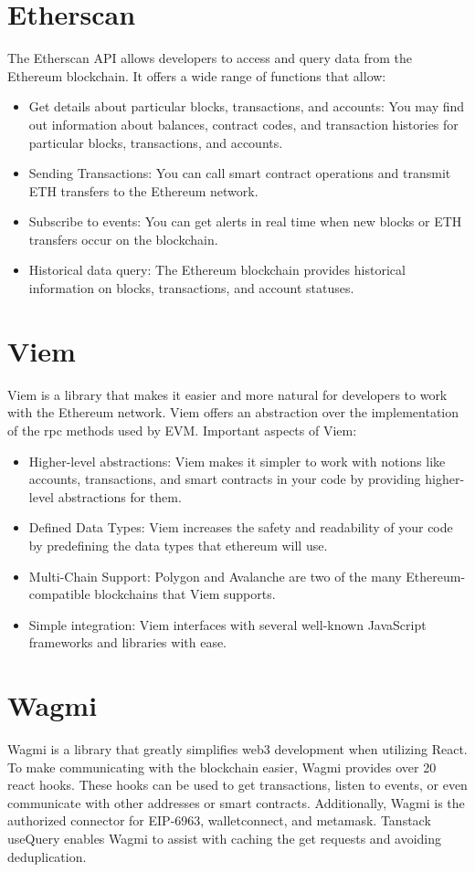 \section{Etherscan}
\label{sec:ch3sec8}
The Etherscan API allows developers to access and query data from the Ethereum blockchain. It offers a wide range of functions that allow:
\begin{itemize}
	\item Get details about particular blocks, transactions, and accounts: You may find out information about balances, contract codes, and transaction histories for particular blocks, transactions, and accounts.
	\item Sending Transactions: You can call smart contract operations and transmit ETH transfers to the Ethereum network.
	\item Subscribe to events: You can get alerts in real time when new blocks or ETH transfers occur on the blockchain.
	\item Historical data query: The Ethereum blockchain provides historical information on blocks, transactions, and account statuses.\cite{etherscan}
\end{itemize}

\section{Viem}
\label{sec:ch3sec9}
Viem is a library that makes it easier and more natural for developers to work with the Ethereum network. Viem offers an abstraction over the implementation of the rpc methods used by EVM.\cite{viem}
Important aspects of Viem:
\begin{itemize}
\item Higher-level abstractions: Viem makes it simpler to work with notions like accounts, transactions, and smart contracts in your code by providing higher-level abstractions for them.
\item Defined Data Types: Viem increases the safety and readability of your code by predefining the data types that ethereum will use.
\item Multi-Chain Support: Polygon and Avalanche are two of the many Ethereum-compatible blockchains that Viem supports.
\item Simple integration: Viem interfaces with several well-known JavaScript frameworks and libraries with ease.
\end{itemize}

\section{Wagmi}
\label{sec:ch3sec10}
Wagmi is a library that greatly simplifies web3 development when utilizing React. To make communicating with the blockchain easier, Wagmi provides over 20 react hooks. These hooks can be used to get transactions, listen to events, or even communicate with other addresses or smart contracts. Additionally, Wagmi is the authorized connector for EIP-6963, walletconnect, and metamask. Tanstack useQuery enables Wagmi to assist with caching the get requests and avoiding deduplication. \cite{wagmi}

